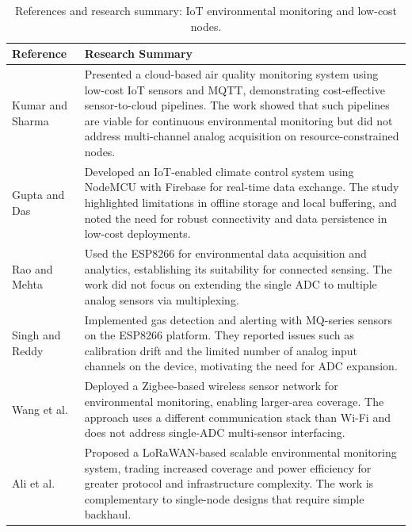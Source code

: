 \documentclass[journal,onecolumn]{IEEEtran}
\begin{document}
\begin{table}[h]
\centering
\caption{References and research summary: IoT environmental monitoring and low-cost nodes.}
\label{tab:lit-iot}
\small
\begin{tabular}{|p{}|p{}|}
\hline
\textbf{Reference} & \textbf{Research Summary} \\
\hline
Kumar and Sharma \cite{sensorcloud2019} & Presented a cloud-based air quality monitoring system using low-cost IoT sensors and MQTT, demonstrating cost-effective sensor-to-cloud pipelines. The work showed that such pipelines are viable for continuous environmental monitoring but did not address multi-channel analog acquisition on resource-constrained nodes. \\
\hline
Gupta and Das \cite{iotclimate2021} & Developed an IoT-enabled climate control system using NodeMCU with Firebase for real-time data exchange. The study highlighted limitations in offline storage and local buffering, and noted the need for robust connectivity and data persistence in low-cost deployments. \\
\hline
Rao and Mehta \cite{esp8266data2022} & Used the ESP8266 for environmental data acquisition and analytics, establishing its suitability for connected sensing. The work did not focus on extending the single ADC to multiple analog sensors via multiplexing. \\
\hline
Singh and Reddy \cite{iotgas2023} & Implemented gas detection and alerting with MQ-series sensors on the ESP8266 platform. They reported issues such as calibration drift and the limited number of analog input channels on the device, motivating the need for ADC expansion. \\
\hline
Wang et al. \cite{zigbeewsn2018} & Deployed a Zigbee-based wireless sensor network for environmental monitoring, enabling larger-area coverage. The approach uses a different communication stack than Wi-Fi and does not address single-ADC multi-sensor interfacing. \\
\hline
Ali et al. \cite{lorawan2020} & Proposed a LoRaWAN-based scalable environmental monitoring system, trading increased coverage and power efficiency for greater protocol and infrastructure complexity. The work is complementary to single-node designs that require simple backhaul. \\
\hline
\end{tabular}
\end{table}
\end{document}
